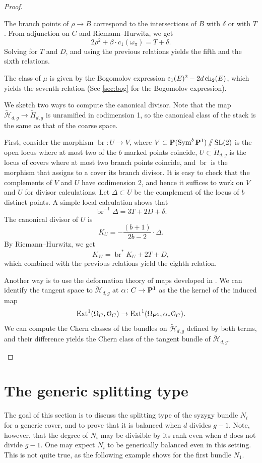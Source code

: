 \documentclass{amsart}
\DeclareMathOperator{\br}{br}
\DeclareMathOperator{\ch}{ch}
\renewcommand{\c}{{\rm c}}
\newcommand{\orb}{\mathcal}
\renewcommand{\O}{{\mathcal O}}
\renewcommand {\P}{{\bf P}}
\providecommand{\SL}{\operatorname{SL}}
\providecommand {\from}{{\colon}}
\providecommand{\Ext}{\operatorname{Ext}}
\providecommand{\Sym}{\operatorname{Sym}}
\numberwithin{equation}{section}
\begin{document}
\begin{proof}
\begin{asparaenum}
    The branch points of $\rho \to B$ correspond to the intersections of $B$ with $\delta$ or with $T$.
    From adjunction on $C$  and Riemann--Hurwitz, we get
    \[ 2\rho^2 + \beta \cdot c_1(\omega_\pi) = T+\delta.\]
    Solving for $T$ and $D$, and using the previous relations yields the fifth and the sixth relations.
  \item[(7)]The class of $\mu$ is given by the Bogomolov expression $\c_1(E)^2-2d\ch_2(E)$, which yields the seventh relation (See \autoref{sec:bog} for the Bogomolov expression).
  \item[(8)]We sketch two ways to compute the canonical divisor.
    Note that the map $\widetilde{\orb H}_{d,g} \to \widetilde H_{d,g}$ is unramified in codimension 1, 
    so the canonical class of the stack is the same as that of the coarse space.

    First, consider the morphism $\br \from U \to V$, where $V \subset \P(\Sym^b\P^1) \sslash \SL(2)$ is the open locus where at most two of the $b$ marked points coincide, $U \subset \widetilde H_{d,g}$ is the locus of covers where at most two branch points coincide, and $\br$ is the morphism that assigns to a cover its branch divisor.
    It is easy to check that the complements of $V$ and $U$ have codimension 2, and hence it suffices to work on $V$ and $U$ for divisor calculations.
    Let $\Delta \subset U$ be the complement of the locus of $b$ distinct points.
    A simple local calculation shows that
    \[ \br^{-1} \Delta = 3T + 2D + \delta.\]
    The canonical divisor of $U$ is 
    \[ K_U = -\frac{(b+1)}{2b-2} \cdot \Delta.\]
    By Riemann--Hurwitz, we get
    \[ K_W = \br^* K_U + 2T + D,\]
    which combined with the previous relations yield the eighth relation.

    Another way is to use the deformation theory of maps developed in \cite{ran:89}.
    We can identify the tangent space to $\widetilde {\orb H}_{d,g}$ at $\alpha \from C \to \P^1$ as the the kernel of the induced map
    \[ \Ext^1(\Omega_C, \O_C) \to \Ext^1(\Omega_{\P^1}, \alpha_* \O_C).\]
    We can compute the Chern classes of the bundles on $\widetilde{\orb H}_{d,g}$ defined by both terms, and their difference yields the Chern class of the tangent bundle of $\widetilde {\orb H}_{d,g}$.
  \end{asparaenum}
\end{proof}


\section{The generic splitting type}\label{sec:gen}
The goal of this section is to discuss the splitting type of the syzygy bundle $N_i$ for a generic cover, and to prove that it is balanced when $d$ divides $g-1$.
Note, however, that the degree of $N_i$ may be divisible by its rank even when $d$ does not divide $g-1$.
One may expect $N_i$ to be generically balanced even in this setting.
This is not quite true, as the following example shows for the first bundle $N_1$.
\end{document}
